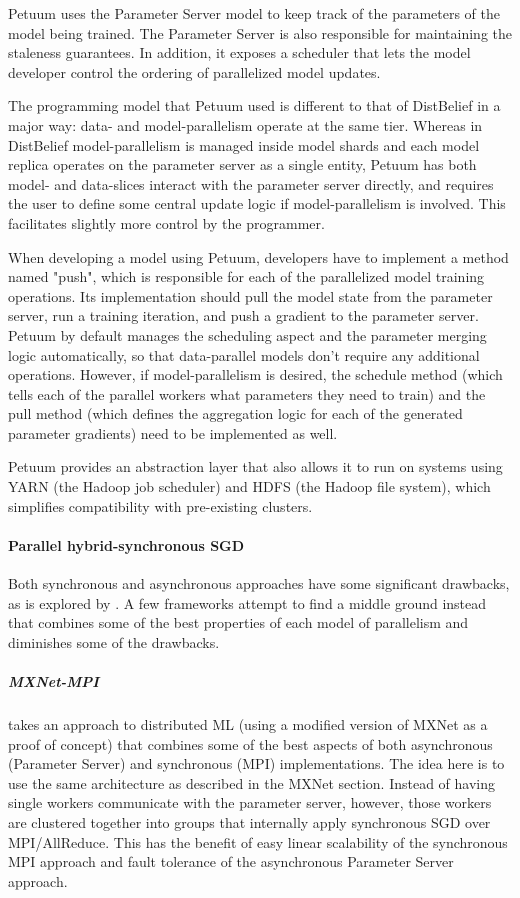 Petuum uses the Parameter Server model to keep track of the parameters of the model being trained. The Parameter Server is also responsible for maintaining the staleness guarantees. In addition, it exposes a scheduler that lets the model developer control the ordering of parallelized model updates.

The programming model that Petuum used is different to that of DistBelief in a major way: data- and model-parallelism operate at the same tier. Whereas in DistBelief model-parallelism is managed inside model shards and each model replica operates on the parameter server as a single entity, Petuum has both model- and data-slices interact with the parameter server directly, and requires the user to define some central update logic if model-parallelism is involved. This facilitates slightly more control by the programmer.

When developing a model using Petuum, developers have to implement a method named "push", which is responsible for each of the parallelized model training operations. Its implementation should pull the model state from the parameter server, run a training iteration, and push a gradient to the parameter server. Petuum by default manages the scheduling aspect and the parameter merging logic automatically, so that data-parallel models don’t require any additional operations. However, if model-parallelism is desired, the schedule method (which tells each of the parallel workers what parameters they need to train) and the pull method (which defines the aggregation logic for each of the generated parameter gradients) need to be implemented as well.

Petuum provides an abstraction layer that also allows it to run on systems using YARN (the Hadoop job scheduler) and HDFS (the Hadoop file system), which simplifies compatibility with pre-existing clusters. 


\paragraph{Parallel hybrid-synchronous SGD}
Both synchronous and asynchronous approaches have some significant drawbacks, as is explored by \citet{ChenJianmin2016}. A few frameworks attempt to find a middle ground instead that combines some of the best properties of each model of parallelism and diminishes some of the drawbacks.

\subparagraph{MXNet-MPI \citep{Mamidala2018}}
takes an approach to distributed ML (using a modified version of MXNet as a proof of concept) that combines some of the best aspects of both asynchronous (Parameter Server) and synchronous (MPI) implementations. The idea here is to use the same architecture as described in the MXNet section. Instead of having single workers communicate with the parameter server, however, those workers are clustered together into groups that internally apply synchronous SGD over MPI/AllReduce. This has the benefit of easy linear scalability of the synchronous MPI approach and fault tolerance of the asynchronous Parameter Server approach.


